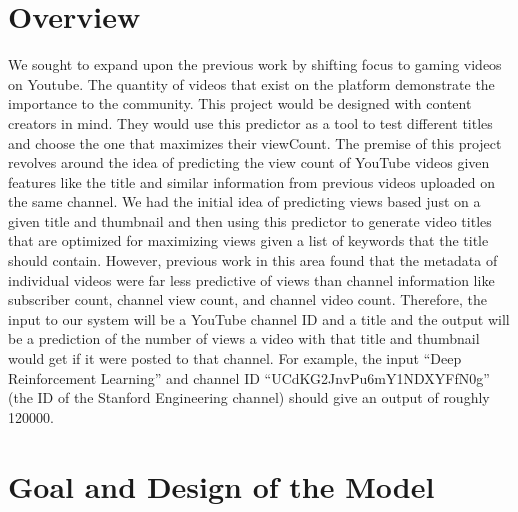 \documentclass[12pt]{article}
\theoremstyle{definition}
\theoremstyle{remark}
\begin{document}
\section{Overview}
We sought to expand upon the previous work by shifting focus to gaming videos on Youtube.
The quantity of videos that exist on the platform demonstrate the importance to the
community. This project would be designed with content creators in mind. They would use this 
predictor as a tool to test different titles and choose the one that maximizes their viewCount. 
The premise of this project revolves around the idea of predicting the view
count of YouTube videos given features like the title
and similar information from previous videos uploaded on the same channel. We
had the initial idea of predicting views based just on a given title and
thumbnail and then using this predictor to generate video titles that are
optimized for maximizing views given a list of keywords that the title should
contain. However, previous work in this area found that the metadata of
individual videos were far less predictive of views than channel information
like subscriber count, channel view count, and channel video count. Therefore,
the input to our system will be a YouTube channel ID and a title and the 
output will be a prediction of the number of
views a video with that title and thumbnail would get if it were posted to that
channel. For example, the input ``Deep Reinforcement Learning'' and channel ID
``UCdKG2JnvPu6mY1NDXYFfN0g'' (the ID of the Stanford Engineering channel) should give an output of roughly 120000. 
  
\section{Goal and Design of the Model}
\end{document}
